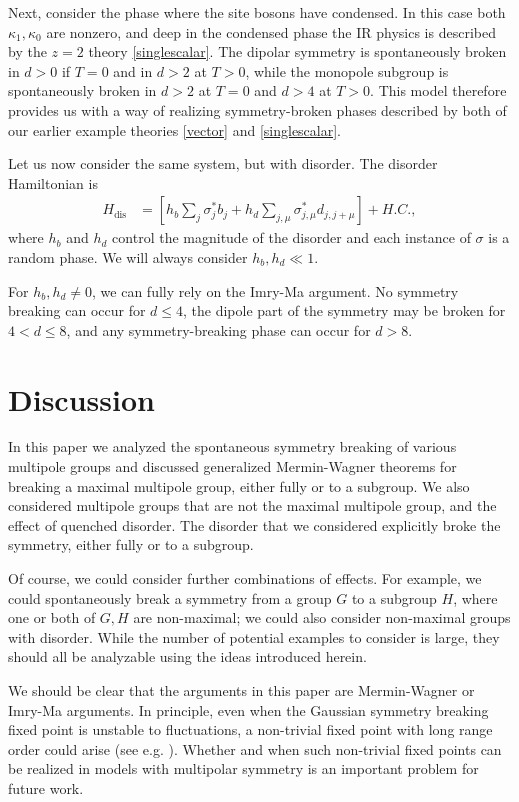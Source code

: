 \documentclass[prb,aps,twocolumn, amsfonts,amsmath,amssymb,nofootinbib,superscriptaddress]{revtex4-2}
\begin{document}
Next, consider the phase where the site bosons have condensed. In this case both $\kappa_1,\kappa_0$ are nonzero, and deep in the condensed phase the IR physics is described by the $z=2$ theory \eqref{singlescalar}. The dipolar symmetry is spontaneously broken in $d>0$ if $T=0$ and in $d>2$ at $T>0$, while the monopole subgroup is spontaneously broken in $d>2$ at $T=0$ and $d>4$ at $T>0$. This model therefore provides us with a way of realizing symmetry-broken phases described by both of our earlier example theories \eqref{vector} and \eqref{singlescalar}.

Let us now consider the same system, but with disorder.  The disorder Hamiltonian is
\begin{align}
H_\text{dis} &= \left[h_b\sum_j \sigma^*_jb_j + h_d \sum_{j,\mu} \sigma^*_{j,\mu}d_{j,j+\mu}\right] + H.C.,
\end{align}
where $h_b$ and $h_d$ control the magnitude of the disorder and each instance of $\sigma$ is a random phase. We will always consider $h_b,h_d\ll1$.

For $h_b,h_d\ne 0$, we can fully rely on the Imry-Ma argument. No symmetry breaking can occur for $d\le 4$, the dipole part of the symmetry may be broken for $4<d\le 8$, and any symmetry-breaking phase can occur for $d>8$. 

\section{Discussion} \label{sec:disc}

In this paper we analyzed the spontaneous symmetry breaking of various multipole groups and discussed generalized Mermin-Wagner theorems for breaking a maximal multipole group, either fully or to a subgroup. We also considered multipole groups that are not the maximal multipole group, and the effect of quenched disorder. The disorder that we considered explicitly broke the symmetry, either fully or to a subgroup.

Of course, we could consider further combinations of effects. For example, we could spontaneously break a symmetry from a group $G$ to a subgroup $H$, where one or both of $G,H$ are non-maximal; we could also consider non-maximal groups with disorder. While the number of potential examples to consider is large, they should all be analyzable using the ideas introduced herein. 

We should be clear that the arguments in this paper are Mermin-Wagner or Imry-Ma arguments. 
In principle, even when the Gaussian symmetry breaking fixed point is unstable to fluctuations, a non-trivial fixed point with long range order could arise (see e.g. \cite{TonerRadzihovsky}). Whether and when such non-trivial fixed points can be realized in models with multipolar symmetry is an important problem for future work. 
\end{document}
